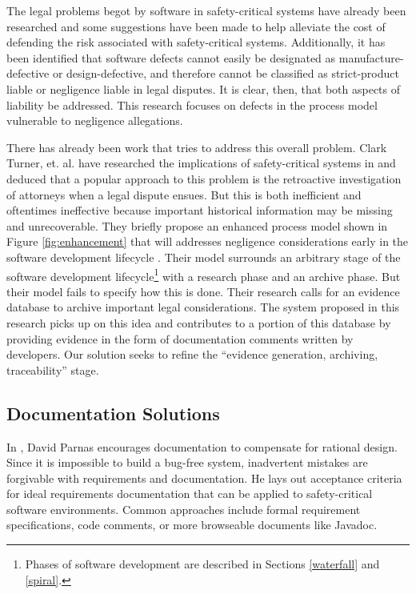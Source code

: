 The legal problems begot by software in safety-critical systems have already
been researched \cite{Turner1996, Turner2000} and some suggestions have been
made to help alleviate the cost of defending the risk associated with
safety-critical systems\cite{Turner2001}. Additionally, it has been identified
that software defects cannot easily be designated as manufacture-defective or
design-defective\cite{Turner2000}, and therefore cannot be classified as
strict-product liable or negligence liable in legal disputes. It is clear, then,
that both aspects of liability be addressed. This research focuses on defects in
the process model vulnerable to negligence allegations.
 
There has already been work that tries to address this overall problem. Clark
Turner, et. al. have researched the implications of safety-critical systems in
\cite{Turner1996, Turner2000, Turner2001} and deduced that a popular approach to
this problem is the retroactive investigation of attorneys when a legal dispute
ensues. But this is both inefficient and oftentimes ineffective because 
important historical information may be missing and unrecoverable. They briefly
propose an enhanced process model shown in Figure \ref{fig:enhancement} that
will addresses negligence considerations early in the software development 
lifecycle \cite{Turner2001}. Their model surrounds an arbitrary stage of the 
software development lifecycle\footnote{Phases of software development are 
described in Sections \ref{waterfall} and \ref{spiral}.} with a research phase
and an archive phase. But their model fails to specify how this is done. Their
research calls for an evidence database to archive important legal 
considerations. The system proposed in this research picks up on this idea and
contributes to a portion of this database by providing evidence in the form of
documentation comments written by developers. Our solution seeks to refine the
``evidence generation, archiving, traceability'' stage.

\subsection{Documentation Solutions}

In \cite{Parnas1986}, David Parnas encourages documentation to compensate for
rational design. Since it is impossible to build a bug-free system, inadvertent
mistakes are forgivable with requirements and documentation. He lays out
acceptance criteria for ideal requirements documentation that can be applied to
safety-critical software environments. Common approaches include formal
requirement specifications, code comments, or more browseable documents like
Javadoc\cite{Javadoc}.

